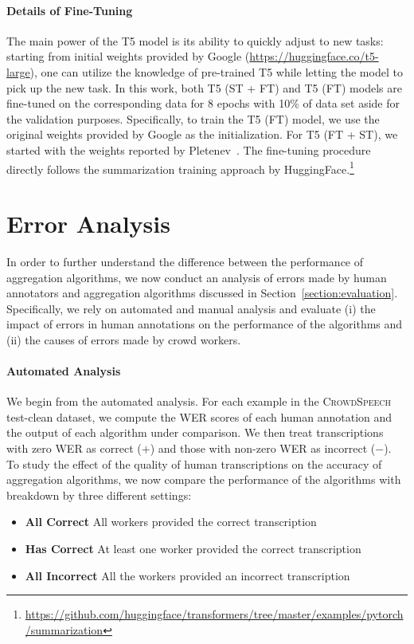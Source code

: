 \documentclass{article}
\newcommand{\speech}{\textsc{CrowdSpeech}}
\begin{document}
\paragraph{Details of Fine-Tuning} The main power of the T5 model is its ability to quickly adjust to new tasks: starting from initial weights provided by Google (\url{https://huggingface.co/t5-large}), one can utilize the knowledge of pre-trained T5 while letting the model to pick up the new task. In this work, both T5 (ST + FT) and T5 (FT) models are fine-tuned on the corresponding data for 8 epochs with 10\% of data set aside for the validation purposes. Specifically, to train the T5 (FT) model, we use the original weights provided by Google as the initialization. For T5 (FT + ST), we started with the weights reported by Pletenev~\citep{pletenev21noisy}. The fine-tuning procedure directly follows the summarization training approach by HuggingFace.\footnote{\url{https://github.com/huggingface/transformers/tree/master/examples/pytorch/summarization}} 




\section{Error Analysis}
\label{section:error}

In order to further understand the difference between the performance of aggregation algorithms, we now conduct an analysis of errors made by human annotators and aggregation algorithms discussed in Section~\ref{section:evaluation}. Specifically, we rely on automated and manual analysis and evaluate (i) the impact of errors in human annotations on the performance of the algorithms and (ii) the causes of errors made by crowd workers. 


\paragraph{Automated Analysis} We begin from the automated analysis. For each example in the \speech{} test-clean dataset, we compute the WER scores of each human annotation and the output of each algorithm under comparison. We then treat transcriptions with zero WER as correct ($+$) and those with non-zero WER as incorrect ($-$). To study the effect of the quality of human transcriptions on the accuracy of aggregation algorithms, we now compare the performance of the algorithms with breakdown by three different settings: 
\begin{itemize}[itemsep=0pt, leftmargin=15pt, topsep=0pt]
    \item \textbf{All Correct} All workers provided the correct transcription
    
    \item \textbf{Has Correct} At least one worker provided the correct transcription
    
    \item \textbf{All Incorrect} All the workers provided an incorrect transcription
\end{itemize}
\end{document}
